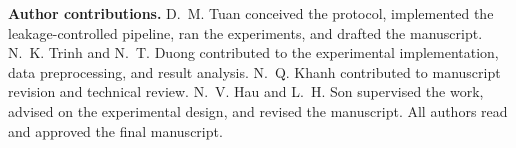 \documentclass[pdflatex,sn-mathphys-num]{sn-jnl}
\begin{document}
\medskip\noindent\textbf{Author contributions.}
D.~M. Tuan conceived the protocol, implemented the leakage-controlled pipeline,
ran the experiments, and drafted the manuscript. N.~K. Trinh and N.~T. Duong
contributed to the experimental implementation, data preprocessing, and result
analysis. N.~Q. Khanh contributed to manuscript revision and technical review.
N.~V. Hau and L.~H. Son supervised the work, advised on the
experimental design, and revised the manuscript. All authors read and approved
the final manuscript.


\end{document}
